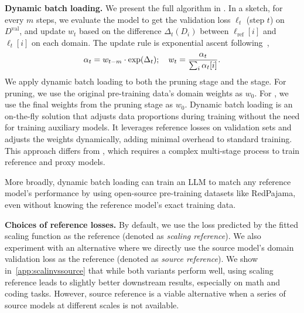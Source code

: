 \textbf{Dynamic batch loading.}
We present the full algorithm in .
In a sketch,
for every $m$ steps, we evaluate the model to get the validation loss $\ell_t$ (step $t$) on $D^{\mathrm{val}}$, 
and update $w_t$ based on the difference $\Delta_t (D_i)$ between $\ell_{\mathrm{ref}}[i]$  and $\ell_t[i]$ on each domain. The update rule is exponential ascent  following~\citet{xie2023doremi},  %
$$
\alpha_t = w_{t-m} \cdot \exp({\Delta_t}); \quad
w_t = \frac{\alpha_t}{\sum_i \alpha_t[i]}. \\
$$
We apply dynamic batch loading to both the pruning stage and the \ct{} stage. 
For  pruning, we use the original pre-training data's domain weights as $w_0$. 
For  \ct{}, we use the final weights from the pruning stage as $w_0$. 
Dynamic batch loading is an on-the-fly solution that adjusts data proportions during training without the need for training auxiliary models. It leverages reference losses on validation sets and adjusts the weights dynamically, adding minimal overhead to standard training. This approach differs from \citet{xie2023doremi}, which requires a complex multi-stage process to train reference and proxy models.


More broadly, dynamic batch loading can train an LLM to match any reference model's performance by using open-source pre-training datasets like RedPajama, even without knowing the reference model's exact training data.

\textbf{Choices of reference losses.}  By default, we use the loss predicted by the fitted scaling function as the reference (denoted as \textit{scaling reference}). We also experiment with an alternative where we directly use the source model's domain validation loss as the reference (denoted as \textit{source reference}). We show in~\ref{app:scalinvssource}  that 
while both variants perform well,  
using scaling reference leads to slightly better downstream results, especially on math and coding tasks. However, source reference is a viable alternative when a series of source models at different scales is not available.
